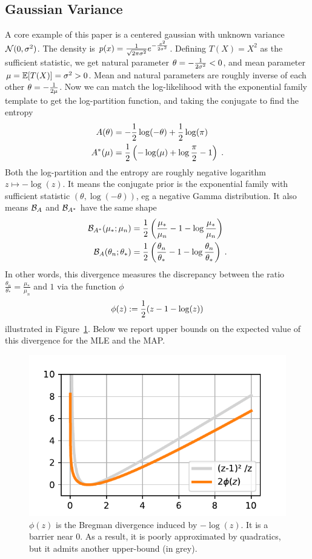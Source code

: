 \documentclass[twoside]{article}
\newcommand{\logpart}{A}
\newcommand{\conj}{\logpart^*}
\newcommand{\bregman}{\cB_\logpart}
\newcommand{\bregmanconj}{\cB_{\logpart^*}}
\newcommand{\natp}{\theta}
\begin{document}
\subsection{Gaussian Variance}
A core example of this paper is a centered gaussian with unknown variance ${\mathcal N}(0,\sigma^2)$. 
The density is	$p(x) = \frac{1}{\sqrt{2\pi \sigma^2}} e^{-\frac{x^2}{2 \sigma^2}}$.
Defining $T(X)=X^2$ as the sufficient statistic, we get natural parameter $\natp = -\inv{2 \sigma^2} <0$, and mean parameter $\mu=\operatorname{\mathbb{E}}[T(X)] = \sigma^2 >0$. 
Mean and natural parameters are roughly inverse of each other $\natp = -\inv{2 \mu}$.
Now we can match the log-likelihood with the exponential family template to get the log-partition function, and taking the conjugate to find the entropy
\begin{align}
	\logpart (\natp) &= - \half \log(-\natp)  + \half \log(\pi) \\
	\conj(\mu) &= \half\left( -\log(\mu) + \log\frac{\pi}{2} - 1 \right) \; .
\end{align}
Both the log-partition and  the entropy are roughly negative logarithm $z\mapsto - \log(z)$.
It means the conjugate prior is the exponential family with sufficient statistic $(\natp, \log(-\natp) )$, eg a negative Gamma distribution.
It also means $\bregman$ and $\bregmanconj$ have the same shape
\begin{align}
	\bregmanconj( \mu_*; \mu_n) 
	&= \half \left ( \frac{\mu_*}{ \mu_n} - 1 - \log  \frac{\mu_*}{ \mu_n} \right) \\
	\bregman( \natp_n; \natp_* )
	&=  \half \left ( \frac{ \natp_n}{\natp_*} - 1 - \log  \frac{ \natp_n}{\natp_*} \right) \; .
\end{align}
In other words, this divergence measures the discrepancy between the ratio $\frac{ \natp_n}{\natp_*} =  \frac{\mu_*}{ \mu_n}  $ and $1$ via the function $\phi$
\begin{align}
	\phi(z) := \frac{1}{2} (z - 1 - \log(z))
\end{align}
illustrated in Figure~\ref{fig:phi}. 
Below we report upper bounds on the expected value of this divergence for the MLE and the MAP.


\begin{figure}[ht]
	\centering
	\includegraphics[width=.4\textwidth]{phi.pdf}
	\caption{$\phi(z)$ is the Bregman divergence induced by $-\log(z)$. It is a barrier near $0$. As a result, it is poorly approximated by quadratics, but it admits another upper-bound (in grey).}
	\label{fig:phi}
\end{figure}
\end{document}
